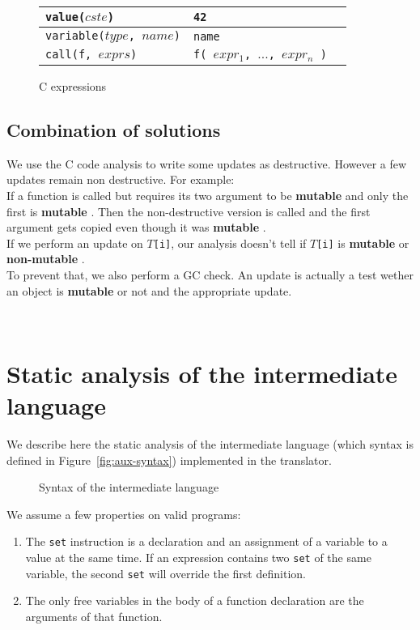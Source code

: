 \documentclass[12pt,a4paper]{article}
\newcommand{\cl}[1]{\texttt{#1}}
\newcommand{\mut}{  \textbf{ mutable } }
\newcommand{\nmut}{ \textbf{ non-mutable } }
\begin{document}
\begin{figure}[!ht]
\begin{tabular}{|p{50mm}|p{50mm}|p{50mm}|}
\hline
\cl{value($cste$)} & \cl{42} & \\ \hline
\cl{variable($type$, $name$)} & \cl{name} & \\ \hline
\cl{call(f, $exprs$)} & \cl{f( $expr_1$, $...$, $expr_n$ )} & \\ \hline
\end{tabular}
\caption{C expressions}
\end{figure}




\subsection{Combination of solutions}

We use the C code analysis to write some updates as destructive. However a few updates remain non destructive. For example:\\

If a function is called but requires its two argument to be \mut  and only the first is \mut. Then the non-destructive version is called and the first argument gets copied even though it was \mut.\\

If we perform an update on \cl{$T$[i]}, our analysis doesn't tell if \cl{$T$[i]} is \mut or \nmut.\\

To prevent that, we also perform a GC check. An update is actually a test wether an object is \mut or not and the appropriate update.






\newpage
\
\newpage

\section{Static analysis of the intermediate language}
\label{staticanal}

We describe here the static analysis of the intermediate language (which syntax is defined in Figure~\ref{fig:aux-syntax}) implemented in the translator.

\begin{figure}[!ht]

\caption{Syntax of the intermediate language}
\end{figure}

We assume a few properties on valid programs:
\begin{enumerate}
\item The \cl{set} instruction is a declaration and an assignment of a variable to a value at the same time. If an expression contains two \cl{set} of the same variable, the second \cl{set} will override the first definition.
\item The only free variables in the body of a function declaration are the arguments of that function.
\end{enumerate}
\end{document}

